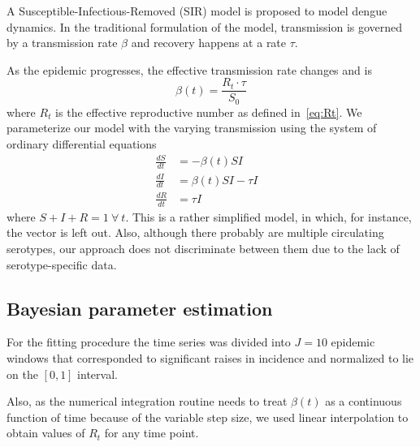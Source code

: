 A Susceptible-Infectious-Removed (SIR) model is proposed to model dengue dynamics.
In the traditional formulation of the model, transmission is governed by a 
transmission rate $\beta$ and recovery happens at a rate $\tau$.

As the epidemic progresses, the effective transmission  rate changes and is
\begin{equation} 
 \label{eq:effbeta}
 \beta(t) = \frac{R_t\cdot\tau}{S_0}
\end{equation}
where $R_t$ is the effective reproductive number as defined in~\ref{eq:Rt}.
We parameterize our model with the varying transmission using the system of 
ordinary differential equations
\begin{align}
 \frac{dS}{dt} &= -\beta(t)SI \\
 \frac{dI}{dt} &= \beta(t)SI - \tau I&\\
 \frac{dR}{dt} &= \tau I&
\end{align}
where $S + I + R = 1 \: \forall\: t$. %
This is a rather simplified model, in which, for instance, the vector is left 
out.
Also, although there probably are multiple circulating serotypes, our approach
does not discriminate between them due to the lack of serotype-specific data.


\subsection*{Bayesian parameter estimation}

For the fitting procedure the time series was divided into $J=10$ epidemic 
windows that corresponded to significant raises in incidence and normalized to 
lie on the $[0,1]$ interval.

Also, as the numerical integration routine needs to treat $\beta(t)$ as a
continuous function of time because of the variable step size, we used linear 
interpolation to obtain values of $R_t$ for any time point.

